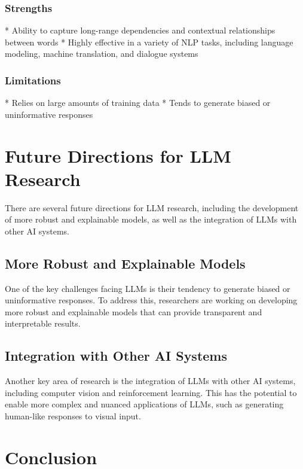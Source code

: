 \documentclass{article}
\begin{document}
\subsubsection{Strengths}

* Ability to capture long-range dependencies and contextual relationships between words
* Highly effective in a variety of NLP tasks, including language modeling, machine translation, and dialogue systems

\subsubsection{Limitations}

* Relies on large amounts of training data
* Tends to generate biased or uninformative responses

\section{Future Directions for LLM Research}

There are several future directions for LLM research, including the development of more robust and explainable models, as well as the integration of LLMs with other AI systems.

\subsection{More Robust and Explainable Models}

One of the key challenges facing LLMs is their tendency to generate biased or uninformative responses. To address this, researchers are working on developing more robust and explainable models that can provide transparent and interpretable results.

\subsection{Integration with Other AI Systems}

Another key area of research is the integration of LLMs with other AI systems, including computer vision and reinforcement learning. This has the potential to enable more complex and nuanced applications of LLMs, such as generating human-like responses to visual input.

\section{Conclusion}
\end{document}
